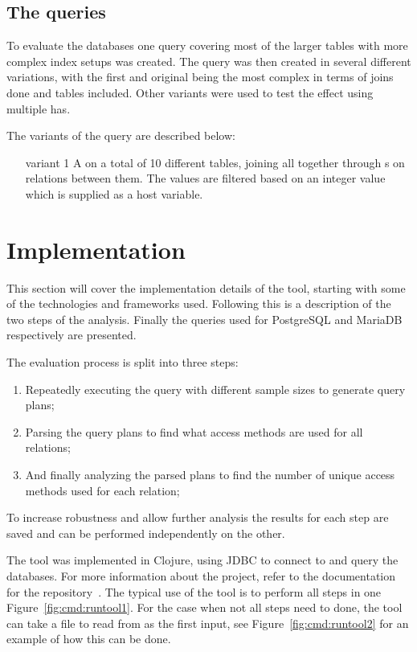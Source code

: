 \subsection{The queries}\label{sec:queries}
To evaluate the databases one query covering most of the larger tables with more
complex index setups was created. The query was then created in several
different variations, with the first and original being the most complex in
terms of joins done and tables included. Other variants were used to test the
effect using multiple  has.

The variants of the query are described below:
\begin{enumerate}
\item [variant 1] A  on a total of 10 different tables,
  joining all together through s on relations between them. The values
  are filtered based on an integer value which is supplied as a host variable.
\end{enumerate}

\section{Implementation}\label{sec:implementation}
This section will cover the implementation details of the tool, starting with
some of the technologies and frameworks used. Following this is a description of
the two steps of the analysis. Finally the queries used for PostgreSQL and
MariaDB respectively are presented.

The evaluation process is split into three steps:
\begin{enumerate}
\item Repeatedly executing the query with different sample sizes to generate
  query plans;
\item Parsing the query plans to find what access methods are used for all
  relations;
\item And finally analyzing the parsed plans to find the number of unique access
  methods used for each relation;
\end{enumerate}

To increase robustness and allow further analysis the results for each step are
saved and can be performed independently on the other.

The tool was implemented in Clojure, using JDBC to connect to and query the
databases. For more information about the project, refer to the documentation for
the repository~\cite{barksten_mbark_m}. The typical use of the tool is to perform all steps in one
Figure~\ref{fig:cmd:runtool1}. For the case when not all steps need to done, the
tool can take a file to read from as the first input, see
Figure~\ref{fig:cmd:runtool2} for an example of how this can be done.

